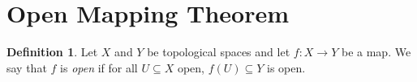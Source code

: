 \documentclass[a4paper, openany]{memoir}
\theoremstyle{definition}
\newtheorem{definition}{Definition}[section]
\theoremstyle{plain}
\newtheorem{proposition}[definition]{Proposition}
\begin{document}
    \section{Open Mapping Theorem}

    \begin{definition}
        Let $X$ and $Y$ be topological spaces and let $f \colon X \to Y$ be a map. We say that $f$ is \emph{open} if for all $U \subseteq X$ open, $f(U) \subseteq Y$ is open.
    \end{definition}

\end{document}
